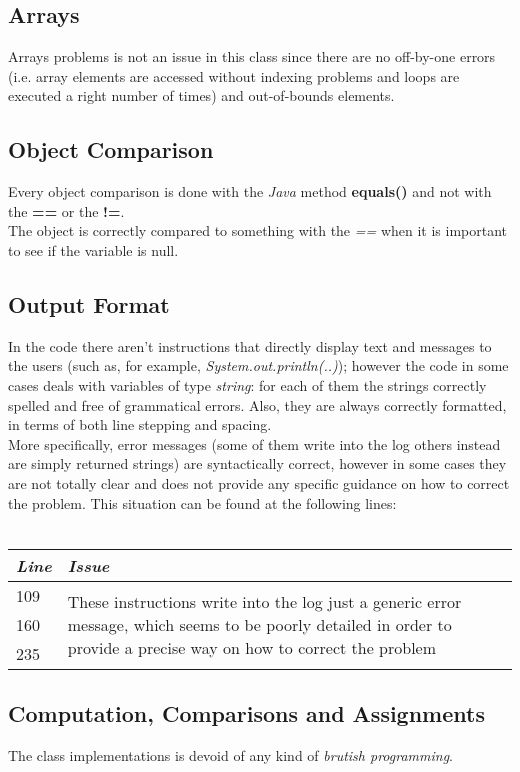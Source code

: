 \documentclass[11pt,a4paper]{report}
\begin{document}
\subsection{Arrays}
Arrays problems is not an issue in this class since there are no off-by-one errors (i.e. array elements are accessed without indexing problems and loops are executed a right number of times) and out-of-bounds elements.
\subsection{Object Comparison}
Every object comparison is done with the \textit{Java} method \textbf{equals()} and not with the \textbf{==} or the \textbf{!=}.\\The object is correctly compared to something with the \textit{==} when it is important to see if the variable is null.
\subsection{Output Format}
In the code there aren't instructions that directly display text and messages to the users (such as, for example, \textit{System.out.println(..)}); however the code in some cases deals with variables of type \textit{string}: for each of them the strings correctly spelled and free of grammatical errors. Also, they are always correctly formatted, in terms of both line stepping and spacing.\\
More specifically, error messages (some of them write into the log others instead are simply returned strings) are syntactically correct, however in some cases they are not totally clear and does not provide any specific guidance on how to correct the problem. This situation can be found at the following lines:\\
\\
\begin{tabularx}{\textwidth}{|l|X|}
	\hline
	\textit{Line} & \textit{Issue}\\
	\hline
		109 & \multirow{3}{\linewidth}{These instructions write into the log just a generic error message, which seems to be poorly detailed in order to provide a precise way on how to correct the problem}\\
		160 & \\
		235 & \\
	\hline
\end{tabularx}

\subsection{Computation, Comparisons and Assignments}
The class implementations is devoid of any kind of \textit{brutish programming}.
\end{document}
